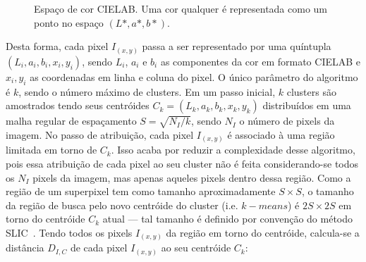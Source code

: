 \begin{figure}[ht!]
\begin{center}
  \caption{Espaço de cor CIELAB. Uma cor qualquer é representada como um ponto
    no espaço $(L*, a*, b*)$.}
  \label{fig:cielab}
  \end{center}
\end{figure}

Desta forma, cada pixel $I_{(x,y)}$ passa a ser representado por uma
quíntupla $(L_i, a_i, b_i, x_i, y_i)$, sendo $L_i$, $a_i$ e $b_i$ as
componentes da cor em formato CIELAB e $x_i, y_i$ as coordenadas em
linha e coluna do pixel. O único parâmetro do algoritmo é $k$, sendo o
número máximo de clusters. Em um passo inicial, $k$ clusters são
amostrados tendo seus centróides $C_k = (L_k, a_k, b_k, x_k, y_k)$
distribuídos em uma malha regular de espaçamento $S = \sqrt{N_I/k}$,
sendo $N_I$ o número de pixels da imagem. No passo de atribuição, cada
pixel $I_{(x,y)}$ é associado à uma região limitada em torno de
$C_k$. Isso acaba por reduzir a complexidade desse algoritmo, pois
essa atribuição de cada pixel ao seu cluster não é feita
considerando-se todos os $N_I$ pixels da imagem, mas apenas aqueles
pixels dentro dessa região. Como a região de um superpixel tem como
tamanho aproximadamente $S \times S$, o tamanho da região de busca
pelo novo centróide do cluster (i.e. $k-means$) é $2S \times 2S$ em
torno do centróide $C_k$ atual --- tal tamanho é definido por
convenção do método SLIC~\cite{slic}. Tendo todos os pixels
$I_{(x,y)}$ da região em torno do centróide, calcula-se a distância
$D_{I,C}$ de cada pixel $I_{(x,y)}$ ao seu centróide $C_k$:

